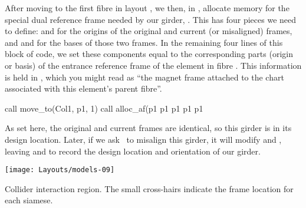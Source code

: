 %
\enlargethispage{\baselineskip}
After moving  to the first fibre in layout , we
then, in , allocate memory for the special dual
reference frame needed by our girder, .%
This has four pieces we need to define:  and  for
the origins of the original and current (or misaligned) frames,
and  and  for the bases of those two frames.%
In the remaining four lines of this block of code, we set these
components equal to the corresponding parts (origin or basis) of
the entrance reference frame of the element in fibre .
This information is held in ,
which you might read as ``the magnet frame attached to the chart
associated with this element's parent fibre''.
%
\begin{ptccode}
call move_to(Col1, p1, 1)
call alloc_af(p1%
p1%
p1%
p1%
p1%
\end{ptccode}
%
As set here, the original and current frames are identical,
so this girder is in its design location. Later, if we ask
\PTC\ to misalign this girder, it will modify 
and , leaving  and
 to record the design location and
orientation of our girder.

\begin{marginfigure}[2\baselineskip]
  \texttt{[image: Layouts/models-09]}
  \caption{Collider interaction region. The small cross-hairs
           indicate the frame location for each siamese.}
  \label{fig:col.siamfr}
\end{marginfigure}

